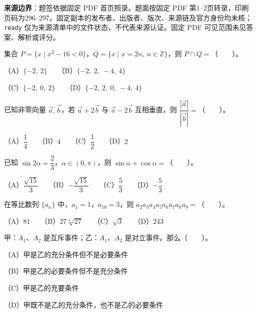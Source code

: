 

\begin{gktip}
\textbf{来源边界}：题签依据固定 PDF 首页照录。题面按固定 PDF 第1–2页转录，印刷页码为296–297。固定副本的发布者、出版者、版次、来源链及官方身份均未核；\texttt{ready} 仅为来源清单中的文件状态，不代表来源认证。固定 PDF 可见范围未见答案、解析或评分。
\end{gktip}


\begin{question}
集合 $P=\{x\mid x^2-16<0\}$，$Q=\{x\mid x=2n,\ n\in\mathbb Z\}$，则 $P\cap Q=$\mbox{（　　）}。

（A）$\{-2,\ 2\}$　　（B）$\{-2,\ 2,\ -4,\ 4\}$

（C）$\{-2,\ 0,\ 2\}$　　（D）$\{-2,\ 2,\ 0,\ -4,\ 4\}$

\end{question}
\begin{question}
已知非零向量 $\vec a,\vec b$，若 $\vec a+2\vec b$ 与 $\vec a-2\vec b$ 互相垂直，则 $\dfrac{|\vec a|}{|\vec b|}=$\mbox{（　　）}。

（A）$\dfrac14$　　（B）$4$　　（C）$\dfrac12$　　（D）$2$

\end{question}
\begin{question}
已知 $\sin 2\alpha=\dfrac23$，$\alpha\in(0,\pi)$，则 $\sin\alpha+\cos\alpha=$\mbox{（　　）}。

（A）$\dfrac{\sqrt{15}}3$　　（B）$-\dfrac{\sqrt{15}}3$　　（C）$\dfrac53$　　（D）$-\dfrac53$

\end{question}
\begin{question}
在等比数列 $\{a_n\}$ 中，$a_1=1$，$a_{10}=3$，则 $a_2a_3a_4a_5a_6a_7a_8a_9=$\mbox{（　　）}。

（A）$81$　　（B）$27\sqrt[5]{27}$　　（C）$\sqrt3$　　（D）$243$

\end{question}
\begin{question}
甲：$A_1\text{、}A_2$ 是互斥事件；乙：$A_1\text{、}A_2$ 是对立事件。那么\mbox{（　　）}。

（A）甲是乙的充分条件但不是必要条件

（B）甲是乙的必要条件但不是充分条件

（C）甲是乙的充要条件

（D）甲既不是乙的充分条件，也不是乙的必要条件

\end{question}
